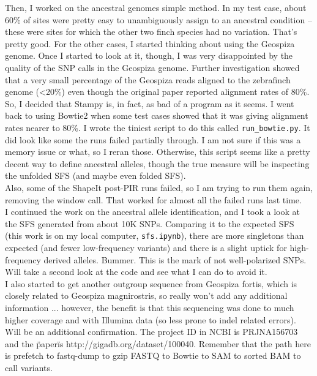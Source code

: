 \documentclass[idxtotoc,hyperref,openany,oneside]{labbook} %
\begin{document}
Then, I worked on the ancestral genomes simple method. In my test case, about 60\% of sites were pretty easy to unambiguously assign to an ancestral condition -- these were sites for which the other two finch species had no variation. That's pretty good. For the other cases, I started thinking about using the Geospiza genome. Once I started to look at it, though, I was very disappointed by the quality of the SNP calls in the Geospiza genome. Further investigation showed that a very small percentage of the Geospiza reads aligned to the zebrafinch genome (<20\%) even though the original paper reported alignment rates of 80\%. So, I decided that Stampy is, in fact, as bad of a program as it seems. I went back to using Bowtie2 when some test cases showed that it was giving alignment rates nearer to 80\%. I wrote the tiniest script to do this called \verb+run_bowtie.py+. It did look like some the runs failed partially through. I am not sure if this was a memory issue or what, so I reran those. Otherwise, this script seems like a pretty decent way to define ancestral alleles, though the true measure will be inspecting the unfolded SFS (and maybe even folded SFS). \\

Also, some of the ShapeIt post-PIR runs failed, so I am trying to run them again, removing the window call. That worked for almost all the failed runs last time. \\

I continued the work on the ancestral allele identification, and I took a look at the SFS generated from about 10K SNPs. Comparing it to the expected SFS (this work is on my local computer, \verb+sfs.ipynb+), there are more singletons than expected (and fewer low-frequency variants) and there is a slight uptick for high-frequency derived alleles. Bummer. This is the mark of not well-polarized SNPs. Will take a second look at the code and see what I can do to avoid it. \\

I also started to get another outgroup sequence from Geospiza fortis, which is closely related to Geospiza magnirostris, so really won't add any additional information ... however, the benefit is that this sequencing was done to much higher coverage and with Illumina data (so less prone to indel related errors). Will be an additional confirmation. The project ID in NCBI is PRJNA156703 and the \"paper\" is http://gigadb.org/dataset/100040. Remember that the path here is prefetch to fastq-dump to gzip FASTQ to Bowtie to SAM to sorted BAM to call variants.
\end{document}
